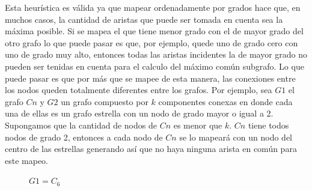 \noindent Esta heurística es válida ya que mapear ordenadamente por grados hace que, en muchos casos, la cantidad de aristas que puede ser tomada en cuenta sea la máxima posible. Si se mapea el que tiene menor grado con el de mayor grado del otro grafo lo que puede pasar es que, por ejemplo, quede uno de grado cero con uno de grado muy alto, entonces todas las aristas incidentes la de mayor grado no pueden ser tenidas en cuenta para el calculo del máximo común subgrafo. Lo que puede pasar es que por más que se mapee de esta manera, las conexiones entre los nodos queden totalmente diferentes entre los grafos. Por ejemplo, sea $G1$ el grafo $Cn$ y $G2$ un grafo compuesto por $k$ componentes conexas en donde cada una de ellas es un grafo estrella con un nodo de grado mayor o igual a 2. Supongamos que la cantidad de nodos de $Cn$ es menor que $k$. $Cn$ tiene todos nodos de grado 2, entonces a cada nodo de $Cn$ se lo mapeará con un nodo del centro de las estrellas generando así que no haya ninguna arista en común para este mapeo.\\
\begin{figure}[H]

\hspace*{\fill} 
\hspace{\fill} 
\caption{$G1=C_{6}$}
\end{figure}

